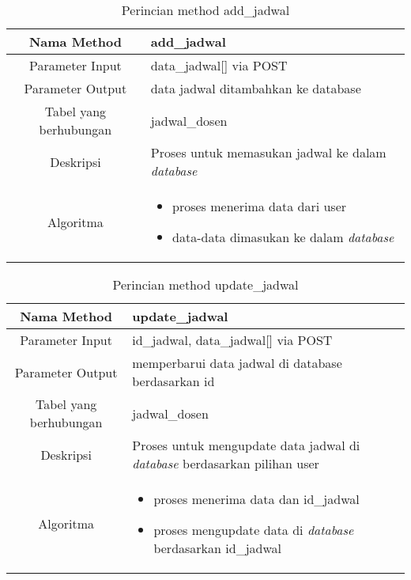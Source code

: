 \begin{center}
\begin{table}[H]
\begin{tabular}{|c|p{11cm}|}
\hline
Nama Method 	& 	add\_jadwal 	\\
\hline
Parameter Input & data\_jadwal[] via POST \\
\hline
Parameter Output & data jadwal ditambahkan ke database \\
\hline
Tabel yang berhubungan & jadwal\_dosen \\
\hline
Deskripsi	& Proses untuk memasukan jadwal ke dalam \textit{database} \\
\hline
Algoritma	& \begin{itemize}
				\item proses menerima data dari user
				\item data-data dimasukan ke dalam \textit{database}
				\end{itemize} \\
\hline
\end{tabular}
\caption{Perincian method add\_jadwal}
\end{table}
\end{center}


\begin{center}
\begin{table}[H]
\begin{tabular}{|c|p{11cm}|}
\hline
Nama Method 	& 	update\_jadwal 	\\
\hline
Parameter Input & id\_jadwal, data\_jadwal[] via POST \\
\hline
Parameter Output & memperbarui data jadwal di database berdasarkan id \\
\hline
Tabel yang berhubungan & jadwal\_dosen \\
\hline
Deskripsi	& Proses untuk mengupdate data jadwal di \textit{database} berdasarkan pilihan user\\
\hline
Algoritma	& \begin{itemize}
				\item proses menerima data dan id\_jadwal
				\item proses mengupdate data di \textit{database} berdasarkan id\_jadwal
				\end{itemize} \\
\hline
\end{tabular}
\caption{Perincian method update\_jadwal}
\end{table}
\end{center}


